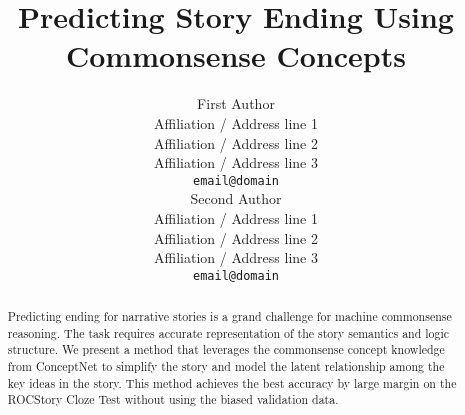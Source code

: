 \documentclass[11pt,a4paper]{article}
\title{Predicting Story Ending Using Commonsense Concepts}
\author{First Author \\
  Affiliation / Address line 1 \\
  Affiliation / Address line 2 \\
  Affiliation / Address line 3 \\
  {\tt email@domain} \\\And
  Second Author \\
  Affiliation / Address line 1 \\
  Affiliation / Address line 2 \\
  Affiliation / Address line 3 \\
  {\tt email@domain} \\}
\date{}
\renewcommand\appendix{\setcounter{secnumdepth}{-2}}
\begin{document}
\maketitle
\begin{abstract}
Predicting ending for narrative stories is a grand challenge for
machine commonsense reasoning. The task requires accurate representation of
the story semantics and logic structure.
We present a method that leverages the commonsense concept knowledge 
from ConceptNet to simplify
the story and model the latent relationship among the key ideas in the story.
This method achieves the best accuracy by large margin on the ROCStory
Cloze Test without using the biased validation data.
\end{abstract}









\appendix
\end{document}

